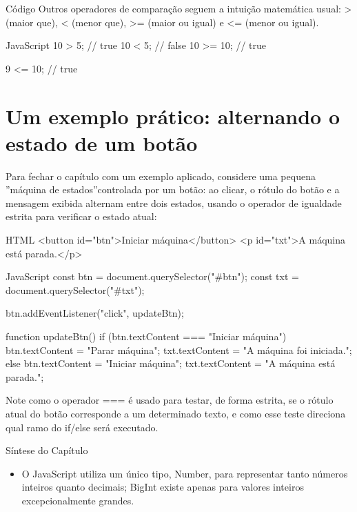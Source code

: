 \begin{codebox}{Código}
Outros operadores de comparação seguem a intuição matemática usual: > (maior
que), < (menor que), >= (maior ou igual) e <= (menor ou igual).
\end{codebox}

\begin{codebox}{JavaScript}
10 > 5;   // true
10 < 5;   // false
10 >= 10; // true



9 <= 10;     // true
\end{codebox}

\section{Um exemplo prático: alternando o estado de um botão}

Para fechar o capítulo com um exemplo aplicado, considere uma pequena ”máquina de estados”controlada por um botão: ao clicar, o rótulo do botão e a mensagem exibida alternam entre dois estados, usando o operador de igualdade estrita para verificar o estado atual:

\begin{codebox}{HTML}
<button id="btn">Iniciar máquina</button>
<p id="txt">A máquina está parada.</p>
\end{codebox}

\begin{codebox}{JavaScript}
const btn = document.querySelector("#btn");
const txt = document.querySelector("#txt");

btn.addEventListener("click", updateBtn);

function updateBtn() {
  if (btn.textContent === "Iniciar máquina") {
    btn.textContent = "Parar máquina";
    txt.textContent = "A máquina foi iniciada.";
  } else {
    btn.textContent = "Iniciar máquina";
    txt.textContent = "A máquina está parada.";
  }
}
\end{codebox}

Note como o operador === é usado para testar, de forma estrita, se o rótulo atual do botão corresponde a um determinado texto, e como esse teste direciona qual ramo do if/else será executado.

Síntese do Capítulo

\begin{itemize}
  \item O JavaScript utiliza um único tipo, Number, para representar tanto números inteiros quanto decimais; BigInt existe apenas para valores inteiros excepcionalmente grandes.
\end{itemize}

